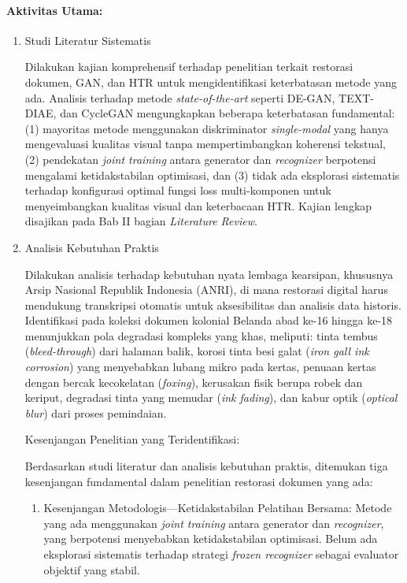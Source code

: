 \documentclass[12pt,a4paper]{article}
\begin{document}
\paragraph{Aktivitas Utama:}

\begin{enumerate}[label=\arabic*., leftmargin=*, nosep]
\item Studi Literatur Sistematis

Dilakukan kajian komprehensif terhadap penelitian terkait restorasi dokumen, GAN, dan HTR untuk mengidentifikasi keterbatasan metode yang ada. Analisis terhadap metode \textit{state-of-the-art} seperti DE-GAN, TEXT-DIAE, dan CycleGAN mengungkapkan beberapa keterbatasan fundamental: (1) mayoritas metode menggunakan diskriminator \textit{single-modal} yang hanya mengevaluasi kualitas visual tanpa mempertimbangkan koherensi tekstual, (2) pendekatan \textit{joint training} antara generator dan \textit{recognizer} berpotensi mengalami ketidakstabilan optimisasi, dan (3) tidak ada eksplorasi sistematis terhadap konfigurasi optimal fungsi loss multi-komponen untuk menyeimbangkan kualitas visual dan keterbacaan HTR. Kajian lengkap disajikan pada Bab II bagian \textit{Literature Review}.

\item Analisis Kebutuhan Praktis

Dilakukan analisis terhadap kebutuhan nyata lembaga kearsipan, khususnya Arsip Nasional Republik Indonesia (ANRI), di mana restorasi digital harus mendukung transkripsi otomatis untuk aksesibilitas dan analisis data historis. Identifikasi pada koleksi dokumen kolonial Belanda abad ke-16 hingga ke-18 menunjukkan pola degradasi kompleks yang khas, meliputi: tinta tembus (\textit{bleed-through}) dari halaman balik, korosi tinta besi galat (\textit{iron gall ink corrosion}) yang menyebabkan lubang mikro pada kertas, penuaan kertas dengan bercak kecokelatan (\textit{foxing}), kerusakan fisik berupa robek dan keriput, degradasi tinta yang memudar (\textit{ink fading}), dan kabur optik (\textit{optical blur}) dari proses pemindaian.

Kesenjangan Penelitian yang Teridentifikasi:

Berdasarkan studi literatur dan analisis kebutuhan praktis, ditemukan tiga kesenjangan fundamental dalam penelitian restorasi dokumen yang ada:

\begin{enumerate}[label=(\alph*), leftmargin=*, nosep]
\item Kesenjangan Metodologis---Ketidakstabilan Pelatihan Bersama: Metode yang ada menggunakan \textit{joint training} antara generator dan \textit{recognizer}, yang berpotensi menyebabkan ketidakstabilan optimisasi. Belum ada eksplorasi sistematis terhadap strategi \textit{frozen recognizer} sebagai evaluator objektif yang stabil.


\end{enumerate}
\end{enumerate}
\end{document}
